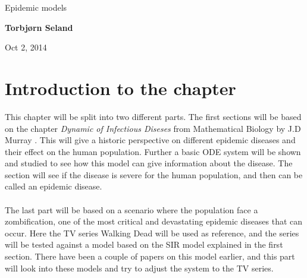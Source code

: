 \documentclass[%
twoside,                 %
final,                   %
10pt]{article}
\begin{document}






\thispagestyle{empty}

\begin{center}
{\LARGE\bf
\begin{spacing}{1.25}
Epidemic models
\end{spacing}
}
\end{center}


\begin{center}
{\bf Torbjørn Seland${}^{}$} \\ [0mm]
\end{center}

    \begin{center}
\end{center}


\begin{center}
Oct 2, 2014
\end{center}

\vspace{1cm}


\tableofcontents


\vspace{1cm} %



\newcommand{\Imax}{I_{\textrm{max}}}
\section{Introduction to the chapter}
This chapter will be split into two different parts. The first sections will be based on the chapter \emph{Dynamic of Infectious Diseses} from Mathematical Biology by J.D Murray \cite{murray2002mathematical}. This will give a historic perspective on different epidemic diseases and their effect on the human population. Further a basic ODE system will be shown and studied to see how this model can give information about the disease. The section will see if the disease is severe for the human population, and then can be called an epidemic disease.
\\
\\
The last part will be based on a scenario where the population face a zombification, one of the most critical and devastating epidemic diseases that can occur. Here the TV series Walking Dead will be used as reference, and the series will be tested against a model based on the SIR model explained in the first section. There have been a couple of papers on this model earlier, and this part will look into these models and try to adjust the system to the TV series.     
\end{document}

